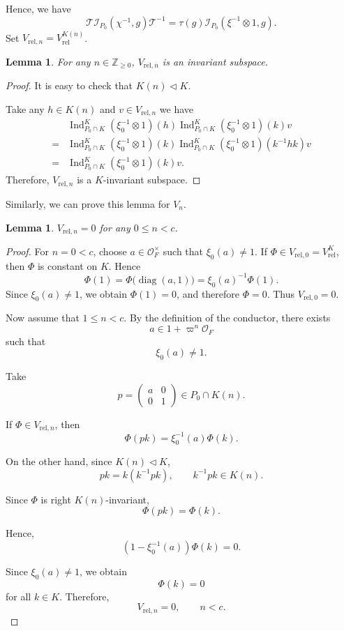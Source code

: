 \documentclass[11pt]{amsart}
\newtheorem {lemma}      [theorem]    {Lemma}
\renewcommand{\rm}{\mathrm}
\theoremstyle{definition}
\numberwithin{equation}{section}
\begin{document}
	
	Hence, we have
	\[
	\mathcal{T} \mathscr{I}_{P_0}(\chi^{-1},g) \mathcal{T}^{-1} = \tau(g) \mathscr{I}_{P_0}(\xi^{-1}\otimes 1,g).
	\]
	Set \(V_{\rm{rel},n}=V_{\rm{rel}}^{K(n)}\). 
	\begin{lemma}
		For any \(n\in \mathbb{Z}_{\ge0}\), \(V_{\rm{rel},n}\) is an
		invariant subspace.
	\end{lemma}
	\begin{proof}
		It is easy to check that \(K(n) \triangleleft K\).
		
		Take any \(h\in K(n)\) and \(v\in V_{\rm{rel},n}\) we have
		\begin{align*}
			&\operatorname{Ind}_{P_0 \cap K}^K (\xi_0^{-1} \otimes 1)(h)\operatorname{Ind}_{P_0 \cap K}^K (\xi_0^{-1} \otimes 1)(k)v \\=&\operatorname{Ind}_{P_0 \cap K}^K (\xi_0^{-1} \otimes 1)(k)\operatorname{Ind}_{P_0 \cap K}^K (\xi_0^{-1} \otimes 1)(k^{-1}hk)v\\
			=&\operatorname{Ind}_{P_0 \cap K}^K (\xi_0^{-1} \otimes 1)(k)v.
		\end{align*}
		Therefore, \(V_{\rm{rel},n}\) is a \(K\)-invariant subspace.
	\end{proof}
	Similarly, we can prove this lemma for \(V_n\).
	\begin{lemma}
		\(V_{\rm{rel},n}=0\) for any \(0\le n<c\).
	\end{lemma}
	\begin{proof}
        For $n=0<c$, choose $a\in\mathcal O_F^\times$ such that $\xi_0(a)\neq1$. If $\Phi\in V_{\mathrm{rel},0}=V_{\mathrm{rel}}^K$, then $\Phi$ is constant on $K$. Hence \[\Phi(1)=\Phi\bigl(\operatorname{diag}(a,1)\bigr)=\xi_0(a)^{-1}\Phi(1).\]
        Since $\xi_0(a)\neq1$, we obtain $\Phi(1)=0$, and therefore $\Phi=0$. Thus $V_{\mathrm{rel},0}=0$.

		Now assume that $1\leq n<c$. By the definition of the conductor, there exists
		\[
		a \in 1 + \varpi^n \mathcal{O}_F
		\]
		such that
		\[
		\xi_0(a) \neq 1.
		\]
		
		\noindent Take
		\[
		p = \begin{pmatrix} a & 0 \\ 0 & 1 \end{pmatrix} \in P_0 \cap K(n).
		\]
		
		\noindent If \(\Phi \in V_{\rm{rel},n}\), then 
		\[
		\Phi(pk) = \xi_0^{-1}(a)\Phi(k).
		\]
		
		\noindent On the other hand, since \(K(n) \triangleleft K\),
		\[
		pk = k(k^{-1}pk), \qquad k^{-1}pk \in K(n).
		\]
		
		\noindent Since \(\Phi\) is right \(K(n)\)-invariant,
		\[
		\Phi(pk) = \Phi(k).
		\]
		
		\noindent Hence,
		\[
		(1 - \xi_0^{-1}(a))\Phi(k) = 0.
		\]
		
		\noindent Since \(\xi_0(a) \neq 1\), we obtain
		\[
		\Phi(k) = 0
		\]
		for all \(k \in K\). Therefore,
		\[
		V_{\rm{rel},n} = 0, \qquad n < c.
		\]
	\end{proof}
\end{document}
